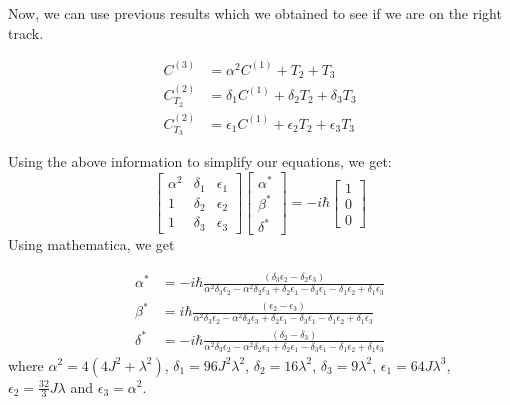 \documentclass[11pt,a4paper]{article}
\begin{document}
Now, we can use previous results which we obtained to see if we are on the right track.

\begin{align*}
C^{(3)} &=   \alpha^2  C^{(1)}  +T_2  +T_3 \\
C^{(2)}_{T_2}&= \delta_1 C^{(1)} + \delta_2 T_2 + \delta_3 T_3 \\
C^{(2)}_{T_3}&= \epsilon_1 C^{(1)} + \epsilon_2 T_2 + \epsilon_3 T_3 
\end{align*}

Using the above information to simplify our equations, we get:
\begin{equation}
\begin{bmatrix}
    \alpha^2       & \delta_{1} & \epsilon_{1} \\
    1     & \delta_{2} & \epsilon_{2} \\
    1      & \delta_{3} & \epsilon_{3}
\end{bmatrix}
\begin{bmatrix}
\alpha^* \\
\beta^* \\
\delta^*   
   \end{bmatrix}
=
- i \hbar \begin{bmatrix}
1 \\
0 \\
0   
   \end{bmatrix}
\end{equation}
Using mathematica, we get 



\begin{align}
\alpha^* &= - i \hbar \frac{  \left(\delta _3 \epsilon _2-\delta _2 \epsilon _3\right)}{\alpha ^2 \delta _3 \epsilon _2-\alpha ^2 \delta _2 \epsilon _3+\delta
   _2 \epsilon _1-\delta _3 \epsilon _1-\delta _1 \epsilon _2+\delta _1 \epsilon _3} \\
  \beta^* &= i \hbar \frac{ \left(\epsilon _2-\epsilon _3\right) }{\alpha ^2 \delta _3 \epsilon _2-\alpha ^2 \delta _2 \epsilon _3+\delta _2 \epsilon
   _1-\delta _3 \epsilon _1-\delta _1 \epsilon _2+\delta _1 \epsilon _3} \\
 \delta^*  &=- i \hbar \frac{ \left(\delta _2-\delta _3\right) }{\alpha ^2 \delta _3 \epsilon _2-\alpha ^2 \delta _2 \epsilon _3+\delta _2 \epsilon _1-\delta
   _3 \epsilon _1-\delta _1 \epsilon _2+\delta _1 \epsilon _3}
\end{align}
where  $\alpha^2= 4 (4 J^2 +  \lambda ^2) $, $\delta_1= 96 J^2 \lambda^2$, $\delta_2= 16 \lambda^2$, $\delta_3= 9 \lambda^2$, $\epsilon_1= 64 J \lambda^3$, $\epsilon_2= \frac{32}{3} J \lambda$ and $\epsilon_3= \alpha^2$.
\appendix
\end{document}
